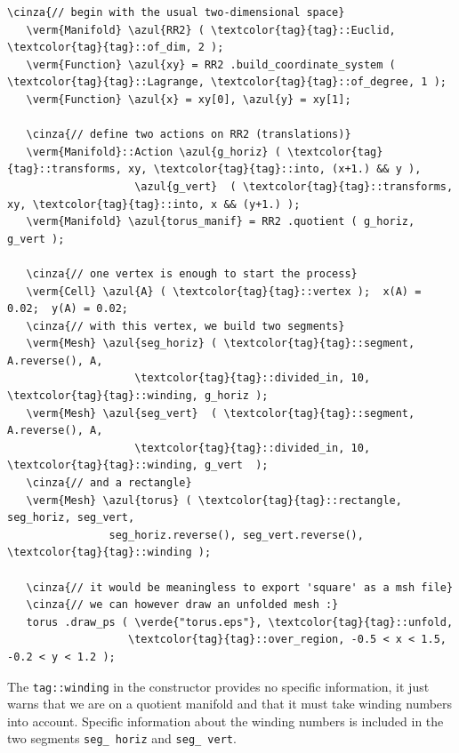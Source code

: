 \begin{Verbatim}[commandchars=\\\{\},formatcom=\small\tt,frame=single,
   label=parag-\ref{\numb section 7.\numb parag 4}.cpp,rulecolor=\color{coment},
   baselinestretch=0.94,framesep=2mm                                            ]
   \cinza{// begin with the usual two-dimensional space}
   \verm{Manifold} \azul{RR2} ( \textcolor{tag}{tag}::Euclid, \textcolor{tag}{tag}::of_dim, 2 );
   \verm{Function} \azul{xy} = RR2 .build_coordinate_system ( \textcolor{tag}{tag}::Lagrange, \textcolor{tag}{tag}::of_degree, 1 );
   \verm{Function} \azul{x} = xy[0], \azul{y} = xy[1];

   \cinza{// define two actions on RR2 (translations)}
   \verm{Manifold}::Action \azul{g_horiz} ( \textcolor{tag}{tag}::transforms, xy, \textcolor{tag}{tag}::into, (x+1.) && y ),
                    \azul{g_vert}  ( \textcolor{tag}{tag}::transforms, xy, \textcolor{tag}{tag}::into, x && (y+1.) );
   \verm{Manifold} \azul{torus_manif} = RR2 .quotient ( g_horiz, g_vert );

   \cinza{// one vertex is enough to start the process}
   \verm{Cell} \azul{A} ( \textcolor{tag}{tag}::vertex );  x(A) = 0.02;  y(A) = 0.02;
   \cinza{// with this vertex, we build two segments}
   \verm{Mesh} \azul{seg_horiz} ( \textcolor{tag}{tag}::segment, A.reverse(), A,
                    \textcolor{tag}{tag}::divided_in, 10, \textcolor{tag}{tag}::winding, g_horiz );
   \verm{Mesh} \azul{seg_vert}  ( \textcolor{tag}{tag}::segment, A.reverse(), A,
                    \textcolor{tag}{tag}::divided_in, 10, \textcolor{tag}{tag}::winding, g_vert  );
   \cinza{// and a rectangle}
   \verm{Mesh} \azul{torus} ( \textcolor{tag}{tag}::rectangle, seg_horiz, seg_vert,
                seg_horiz.reverse(), seg_vert.reverse(), \textcolor{tag}{tag}::winding );

   \cinza{// it would be meaningless to export 'square' as a msh file}
   \cinza{// we can however draw an unfolded mesh :}
   torus .draw_ps ( \verde{"torus.eps"}, \textcolor{tag}{tag}::unfold,
                   \textcolor{tag}{tag}::over_region, -0.5 < x < 1.5, -0.2 < y < 1.2 );
\end{Verbatim}

The {\small\tt\textcolor{tag}{tag}::winding} in the constructor {\small\tt{}}
{\small\tt{}} provides no specific information, it just warns {\maniFEM} that
we are on a quotient manifold and that it must take winding numbers into account.
Specific information about the winding numbers is included in the two segments
{\small\tt seg\_\,horiz} and {\small\tt seg\_\,vert}.

